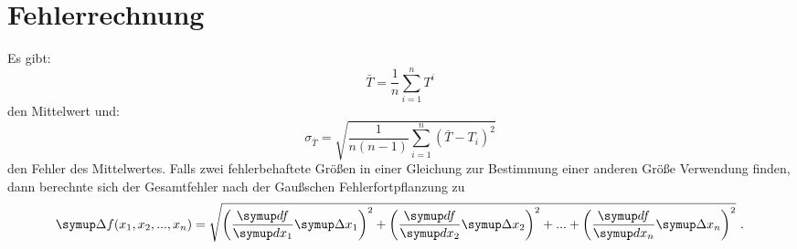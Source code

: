 \section{Fehlerrechnung}
Es gibt:
\begin{equation}
  \bar{T} = \frac{1}{n} \sum_{i=1}^{n} T^{i}
  \label{eqn:1}
\end{equation}
den Mittelwert und:
\begin{equation}
  \sigma_{\bar{T}} = \sqrt{\frac{1}{n(n-1)} \sum_{i=1}^{n}(\bar{T}-T_i)^2}
  \label{eqn:2}
\end{equation}
den Fehler des Mittelwertes. Falls zwei fehlerbehaftete Größen in einer Gleichung
zur Bestimmung einer anderen Größe Verwendung finden, dann berechnte sich der Gesamtfehler
nach der Gaußschen Fehlerfortpflanzung zu
\begin{equation}
    \symup \Delta f(x_1, x_2, ..., x_n) = \sqrt{\left(\frac{\symup df}{\symup dx_1} \symup \Delta
    x_1 \right)^2 +    \left(\frac{\symup df}{\symup dx_2} \symup \Delta
    x_2 \right)^2 + ... + \left(\frac{\symup df}{\symup dx_n} \symup \Delta x_n \right)^2} \ .
\end{equation}

